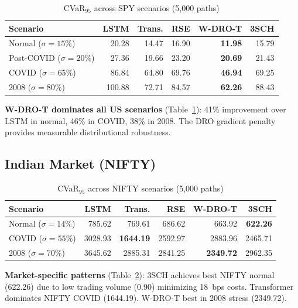 \documentclass[11pt]{article}
\begin{document}
\begin{table}[t]
\centering
\caption{CVaR$_{95}$ across SPY scenarios (5,000 paths)}
\label{tab:spy}
\small
\begin{tabular}{lrrrrr}
\toprule
\textbf{Scenario} & \textbf{LSTM} & \textbf{Trans.} & \textbf{RSE} & \textbf{W-DRO-T} & \textbf{3SCH} \\
\midrule
Normal ($\sigma\!=\!15\%$) & 20.28 & 14.47 & 16.90 & \textbf{11.98} & 15.79 \\
Post-COVID ($\sigma\!=\!20\%$) & 27.36 & 19.66 & 23.20 & \textbf{20.69} & 21.43 \\
COVID ($\sigma\!=\!65\%$) & 86.84 & 64.80 & 69.76 & \textbf{46.94} & 69.25 \\
2008 ($\sigma\!=\!80\%$) & 100.88 & 72.71 & 84.57 & \textbf{62.26} & 88.43 \\
\bottomrule
\end{tabular}
\end{table}

\textbf{W-DRO-T dominates all US scenarios} (Table~\ref{tab:spy}): 41\% improvement over LSTM in normal, 46\% in COVID, 38\% in 2008. The DRO gradient penalty provides measurable distributional robustness.

\subsection{Indian Market (NIFTY)}

\begin{table}[t]
\centering
\caption{CVaR$_{95}$ across NIFTY scenarios (5,000 paths)}
\label{tab:nifty}
\small
\begin{tabular}{lrrrrr}
\toprule
\textbf{Scenario} & \textbf{LSTM} & \textbf{Trans.} & \textbf{RSE} & \textbf{W-DRO-T} & \textbf{3SCH} \\
\midrule
Normal ($\sigma\!=\!14\%$) & 785.62 & 769.61 & 686.62 & 663.92 & \textbf{622.26} \\
COVID ($\sigma\!=\!55\%$) & 3028.93 & \textbf{1644.19} & 2592.97 & 2883.96 & 2465.71 \\
2008 ($\sigma\!=\!70\%$) & 3645.62 & 2885.31 & 2841.25 & \textbf{2349.72} & 2962.35 \\
\bottomrule
\end{tabular}
\end{table}

\textbf{Market-specific patterns} (Table~\ref{tab:nifty}): 3SCH achieves best NIFTY normal (622.26) due to low trading volume (0.90) minimizing 18~bps costs. Transformer dominates NIFTY COVID (1644.19). W-DRO-T best in 2008 stress (2349.72).
\end{document}
